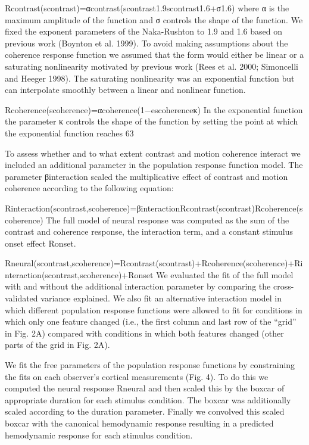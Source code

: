 \documentclass{report}
\begin{document}
Rcontrast(scontrast)=αcontrast(scontrast1.9scontrast1.6+σ1.6)
where α is the maximum amplitude of the function and σ controls the shape of the function. We fixed the exponent parameters of the Naka-Rushton to 1.9 and 1.6 based on previous work (Boynton et al. 1999).
To avoid making assumptions about the coherence response function we assumed that the form would either be linear or a saturating nonlinearity motivated by previous work (Rees et al. 2000; Simoncelli and Heeger 1998). The saturating nonlinearity was an exponential function but can interpolate smoothly between a linear and nonlinear function.

Rcoherence(scoherence)=αcoherence(1−escoherenceκ)
In the exponential function the parameter κ controls the shape of the function by setting the point at which the exponential function reaches 63%

To assess whether and to what extent contrast and motion coherence interact we included an additional parameter in the population response function model. The parameter βinteraction scaled the multiplicative effect of contrast and motion coherence according to the following equation:

Rinteraction(scontrast,scoherence)=βinteractionRcontrast(scontrast)Rcoherence(scoherence)
The full model of neural response was computed as the sum of the contrast and coherence response, the interaction term, and a constant stimulus onset effect Ronset.

Rneural(scontrast,scoherence)=Rcontrast(scontrast)+Rcoherence(scoherence)+Rinteraction(scontrast,scoherence)+Ronset
We evaluated the fit of the full model with and without the additional interaction parameter by comparing the cross-validated variance explained. We also fit an alternative interaction model in which different population response functions were allowed to fit for conditions in which only one feature changed (i.e., the first column and last row of the “grid” in Fig. 2A) compared with conditions in which both features changed (other parts of the grid in Fig. 2A).

We fit the free parameters of the population response functions by constraining the fits on each observer’s cortical measurements (Fig. 4). To do this we computed the neural response Rneural and then scaled this by the boxcar of appropriate duration for each stimulus condition. The boxcar was additionally scaled according to the duration parameter. Finally we convolved this scaled boxcar with the canonical hemodynamic response resulting in a predicted hemodynamic response for each stimulus condition.
\end{document}
